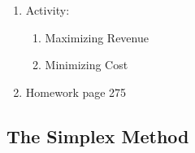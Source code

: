 \documentclass[12pt]{amsart}
\begin{document}
\begin{enumerate}
\item Activity: 
	\begin{enumerate}
		\item Maximizing Revenue \\

		\vspace{4in}
		\item Minimizing Cost \\
		\vspace{4in}
		
	\end{enumerate}

\item Homework page 275

\end{enumerate}
\newpage
\subsection{The Simplex Method}
\end{document}
